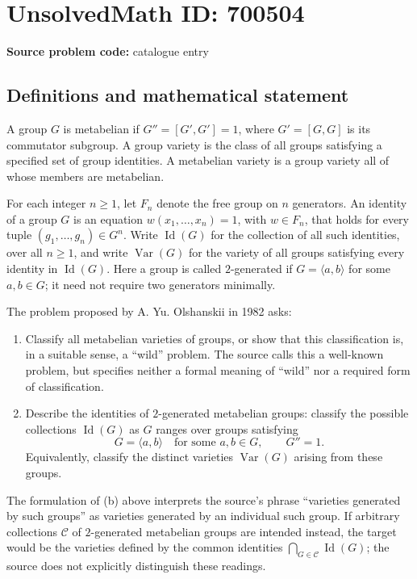 \documentclass[11pt]{article}
\begin{document}
\section*{UnsolvedMath ID: 700504}
\textbf{Source problem code:} catalogue entry
\subsection{Definitions and mathematical statement}
A group \(G\) is metabelian if \(G''=[G',G']=1\), where \(G'=[G,G]\) is its commutator subgroup. A group variety is the class of all groups satisfying a specified set of group identities. A metabelian variety is a group variety all of whose members are metabelian.

For each integer \(n\geq 1\), let \(F_n\) denote the free group on \(n\) generators. An identity of a group \(G\) is an equation \(w(x_1,\ldots,x_n)=1\), with \(w\in F_n\), that holds for every tuple \((g_1,\ldots,g_n)\in G^n\). Write \(\operatorname{Id}(G)\) for the collection of all such identities, over all \(n\geq 1\), and write \(\operatorname{Var}(G)\) for the variety of all groups satisfying every identity in \(\operatorname{Id}(G)\). Here a group is called \(2\)-generated if \(G=\langle a,b\rangle\) for some \(a,b\in G\); it need not require two generators minimally.

The problem proposed by A. Yu. Olshanskii in 1982 asks:
\begin{enumerate}
\item[(a)] Classify all metabelian varieties of groups, or show that this classification is, in a suitable sense, a ``wild'' problem. The source calls this a well-known problem, but specifies neither a formal meaning of ``wild'' nor a required form of classification.
\item[(b)] Describe the identities of \(2\)-generated metabelian groups: classify the possible collections \(\operatorname{Id}(G)\) as \(G\) ranges over groups satisfying
\[
G=\langle a,b\rangle\quad\text{for some }a,b\in G,
\qquad G''=1.
\]
Equivalently, classify the distinct varieties \(\operatorname{Var}(G)\) arising from these groups.
\end{enumerate}
The formulation of (b) above interprets the source's phrase ``varieties generated by such groups'' as varieties generated by an individual such group. If arbitrary collections \(\mathcal C\) of \(2\)-generated metabelian groups are intended instead, the target would be the varieties defined by the common identities \(\bigcap_{G\in\mathcal C}\operatorname{Id}(G)\); the source does not explicitly distinguish these readings.
\end{document}
